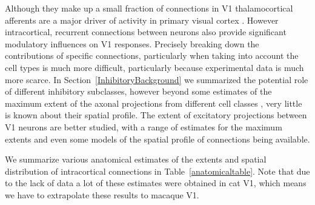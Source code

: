 Although they make up a small fraction of connections in V1
thalamocortical afferents are a major driver of activity in primary
visual cortex \citep{Binzegger2004}. However intracortical, recurrent
connections between neurons also provide significant modulatory
influences on V1 responses. Precisely breaking down the contributions
of specific connections, particularly when taking into account the
cell types is much more difficult, particularly because experimental
data is much more scarce. In Section~\ref{InhibitoryBackground} we
summarized the potential role of different inhibitory subclasses,
however beyond some estimates of the maximum extent of the axonal
projections from different cell classes \citep{Kisvarday1993,
  Kisvarday1997a, Budd2001, Buzas2001}, very little is known about
their spatial profile. The extent of excitatory projections between V1
neurons are better studied, with a range of estimates for the maximum
extents \citep{Angelucci2002} and even some models of the spatial
profile of connections \citep{Buzas2006} being available.

We summarize various anatomical estimates of the extents and spatial
distribution of intracortical connections in
Table~\ref{anatomicaltable}. Note that due to the lack of data a lot
of these estimates were obtained in cat V1, which means we have to
extrapolate these results to macaque V1.


